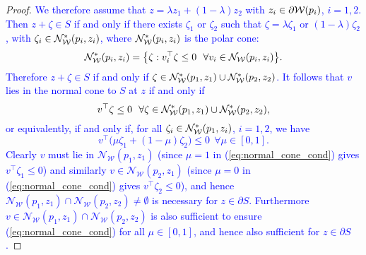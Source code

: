 \documentclass[smallextended]{svjour3}       %
\numberwithin{equation}{section}
\newcommand{\revision}[1]{\textcolor{blue}{#1}}
\begin{document}
\begin{proof}
\revision{We therefore assume that $z = \lambda z_1 + (1-\lambda) z_2$ with $z_i\in\partial\mathcal{W}(p_i)$, $i=1,2$. Then $z+\zeta\in S$ if and only if there exists $\zeta_1$ or $\zeta_2$ such that $\zeta = \lambda\zeta_1$ or $(1-\lambda)\zeta_2$,  with $\zeta_i\in \mathcal{N}_{\mathcal{W}}^\ast(p_i, z_i)$, where $\mathcal{N}_{\mathcal{W}}^\ast(p_i, z_i)$ is the polar cone:
\[
\mathcal{N}_{\mathcal{W}}^\ast(p_i,z_i) = \bigl\{ \zeta : v_i^\top\zeta \leq 0 \ \ \forall v_i\in\mathcal{N}_{\mathcal{W}}(p_i,z_i) \bigr\} .
\]
Therefore $z+\zeta\in S$ if and only if
$\zeta\in\mathcal{N}_{\mathcal{W}}^\ast(p_1,z_1)\cup \mathcal{N}_{\mathcal{W}}^\ast(p_2,z_2)$.
It follows that $v$ lies in the normal cone to $S$ at $z$ if and only if 
\[
v^\top \zeta \leq 0 \ \ \forall \zeta\in\mathcal{N}_{\mathcal{W}}^\ast(p_1,z_1) \cup \mathcal{N}_{\mathcal{W}}^\ast(p_2,z_2),
\]
or equivalently, if and only if, for all $\zeta_i\in\mathcal{N}_{\mathcal{W}}^\ast(p_1,z_i)$,
$i=1,2$, we have
\begin{equation}\label{eq:normal_cone_cond}
v^\top \bigl( \mu \zeta_1 + (1-\mu) \zeta_2 \bigr) \leq 0 \ \ \forall \mu\in [0, 1].
\end{equation}
Clearly $v$ must lie in $\mathcal N_{\mathcal W}(p_1,z_1)$ (since $\mu = 1$ in (\ref{eq:normal_cone_cond}) gives $v^\top\zeta_1 \leq 0$) and similarly $v\in \mathcal N_{\mathcal W}(p_2,z_1)$ (since $\mu = 0$ in (\ref{eq:normal_cone_cond}) gives $v^\top\zeta_2 \leq 0$), and hence $\mathcal N_{\mathcal W}(p_1,z_1) \cap \mathcal N_{\mathcal W}(p_2,z_2) \neq \emptyset$ is necessary for $z\in\partial S$.
  Furthermore $v\in \mathcal N_{\mathcal W}(p_1,z_1)\cap \mathcal N_{\mathcal W}(p_2,z_2)$ is also sufficient to ensure (\ref{eq:normal_cone_cond}) for all $\mu\in[0,1]$, and hence also sufficient for $z\in\partial S$.}


\end{proof}
\end{document}
